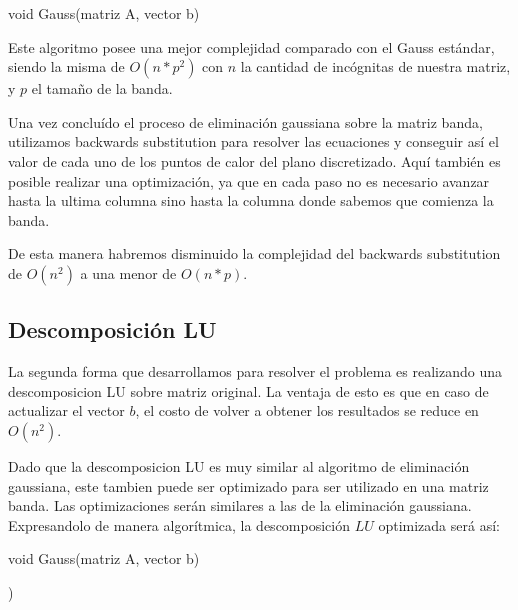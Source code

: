 \begin{algorithm}
\begin{algorithmic}[1]\parskip=1mm
\caption{void Gauss(matriz A, vector b)}
\end{algorithmic}
\end{algorithm}

Este algoritmo posee una mejor complejidad comparado con el Gauss estándar, siendo la misma de $O(n*p^2)$ con $n$ la cantidad de incógnitas de nuestra matriz, y $p$ el tamaño de la banda.

Una vez concluído el proceso de eliminación gaussiana sobre la matriz banda, utilizamos backwards substitution para resolver las ecuaciones y conseguir así el valor de cada uno de los puntos de calor del plano discretizado. Aquí también es posible realizar una optimización, ya que en cada paso no es necesario avanzar hasta la ultima columna sino hasta la columna donde sabemos que comienza la banda.

De esta manera habremos disminuido la complejidad del backwards substitution de $O(n^2)$ a una menor de $O(n*p)$.

\subsection{Descomposición LU}

La segunda forma que desarrollamos para resolver el problema es realizando una descomposicion LU sobre matriz original. La ventaja de esto es que en caso de actualizar el vector $b$, el costo de volver a obtener los resultados se reduce en $O(n^2)$.

Dado que la descomposicion LU es muy similar al algoritmo de eliminación gaussiana, este tambien puede ser optimizado para ser utilizado en una matriz banda. Las optimizaciones serán similares a las de la eliminación gaussiana. Expresandolo de manera algorítmica, la descomposición $LU$ optimizada será así:

\begin{algorithm}
\begin{algorithmic}[1]\parskip=1mm
\caption{void Gauss(matriz A, vector b)}
   )
\end{algorithmic}
\end{algorithm}

